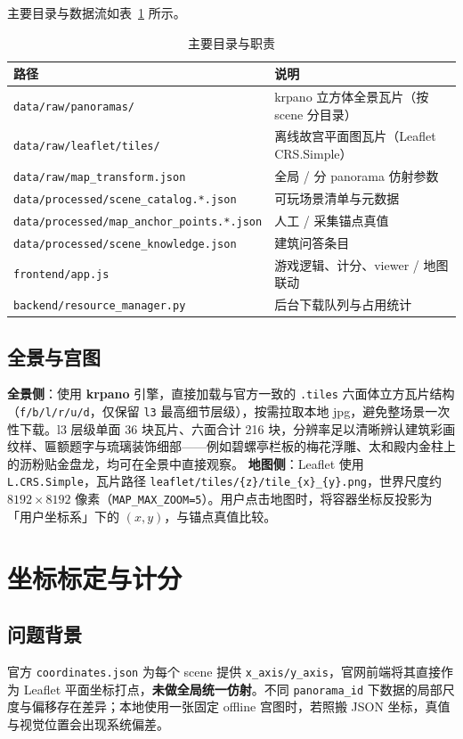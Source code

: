 \documentclass[UTF8,a4paper,12pt]{ctexart}
\begin{document}
主要目录与数据流如表~\ref{tab:dirs} 所示。
\begin{table}[htbp]
  \centering
  \caption{主要目录与职责}
  \label{tab:dirs}
  \begin{tabular}{@{}ll@{}}
    \toprule
    路径 & 说明 \\
    \midrule
    \texttt{data/raw/panoramas/} & krpano 立方体全景瓦片（按 scene 分目录） \\
    \texttt{data/raw/leaflet/tiles/} & 离线故宫平面图瓦片（Leaflet CRS.Simple） \\
    \texttt{data/raw/map\_transform.json} & 全局 / 分 panorama 仿射参数 \\
    \texttt{data/processed/scene\_catalog.*.json} & 可玩场景清单与元数据 \\
    \texttt{data/processed/map\_anchor\_points.*.json} & 人工 / 采集锚点真值 \\
    \texttt{data/processed/scene\_knowledge.json} & 建筑问答条目 \\
    \texttt{frontend/app.js} & 游戏逻辑、计分、viewer / 地图联动 \\
    \texttt{backend/resource\_manager.py} & 后台下载队列与占用统计 \\
    \bottomrule
  \end{tabular}
\end{table}

\subsection{全景与宫图}
\textbf{全景侧}：使用 \textbf{krpano} 引擎，直接加载与官方一致的 \texttt{.tiles} 六面体立方瓦片结构（\texttt{f/b/l/r/u/d}，仅保留 \texttt{l3} 最高细节层级），按需拉取本地 jpg，避免整场景一次性下载。l3 层级单面 36 块瓦片、六面合计 216 块，分辨率足以清晰辨认建筑彩画纹样、匾额题字与琉璃装饰细部——例如碧螺亭栏板的梅花浮雕、太和殿内金柱上的沥粉贴金盘龙，均可在全景中直接观察。
\textbf{地图侧}：Leaflet 使用 \texttt{L.CRS.Simple}，瓦片路径 \texttt{leaflet/tiles/\{z\}/tile\_\{x\}\_\{y\}.png}，世界尺度约 $8192\times 8192$ 像素（\texttt{MAP\_MAX\_ZOOM=5}）。用户点击地图时，将容器坐标反投影为「用户坐标系」下的 $(x,y)$，与锚点真值比较。
\section{坐标标定与计分}
\subsection{问题背景}
官方 \texttt{coordinates.json} 为每个 scene 提供 \texttt{x\_axis/y\_axis}，官网前端将其直接作为 Leaflet 平面坐标打点，\textbf{未做全局统一仿射}。不同 \texttt{panorama\_id} 下数据的局部尺度与偏移存在差异；本地使用一张固定 offline 宫图时，若照搬 JSON 坐标，真值与视觉位置会出现系统偏差。
\end{document}
